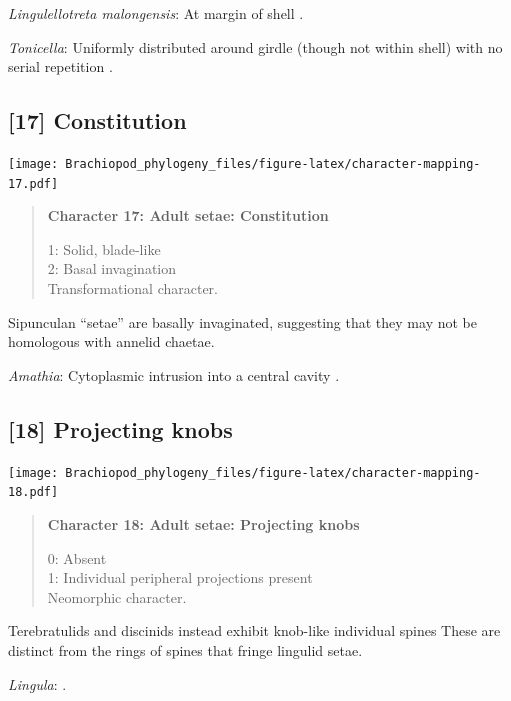 \documentclass[openany]{book}
\begin{document}
\hypertarget{Lingulellotreta_malongensis-coding-16}{}
\emph{Lingulellotreta malongensis}: At margin of shell
\citep{Zhang2005}.

\hypertarget{Tonicella-coding-16}{}
\emph{Tonicella}: Uniformly distributed around girdle (though not within
shell) with no serial repetition \citep{Vinther2005, Leise1988}.

\subsection*{{[}17{]} Constitution}\label{constitution}

\texttt{[image: Brachiopod\_phylogeny\_files/figure-latex/character-mapping-17.pdf]}

\begin{quote}
\textbf{Character 17: Adult setae: Constitution}

1: Solid, blade-like\\
2: Basal invagination\\
Transformational character.
\end{quote}

Sipunculan ``setae'' are basally invaginated, suggesting that they may
not be homologous with annelid chaetae.

\hypertarget{Amathia-coding-17}{}
\emph{Amathia}: Cytoplasmic intrusion into a central cavity
\citep{Gordon1975}.

\subsection*{{[}18{]} Projecting knobs}\label{projecting-knobs}

\texttt{[image: Brachiopod\_phylogeny\_files/figure-latex/character-mapping-18.pdf]}

\begin{quote}
\textbf{Character 18: Adult setae: Projecting knobs}

0: Absent\\
1: Individual peripheral projections present\\
Neomorphic character.
\end{quote}

Terebratulids and discinids instead exhibit knob-like individual spines
These are distinct from the rings of spines that fringe lingulid setae.

\hypertarget{Lingula-coding-18}{}
\emph{Lingula}: \citet{Luter2000}.
\end{document}
